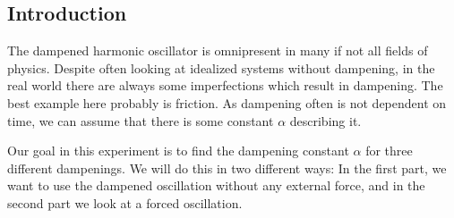 \subsection{Introduction}

The dampened harmonic oscillator is omnipresent in many if not all fields of physics. 
Despite often looking at idealized systems without dampening, in the real world there are always some imperfections which result in dampening.
The best example here probably is friction. 
As dampening often is not dependent on time, we can assume that there is some constant $\alpha$ describing it.

Our goal in this experiment is to find the dampening constant $\alpha$ for three different dampenings.
We will do this in two different ways:
In the first part, we want to use the dampened oscillation without any external force, and in the second part we look at a forced oscillation.

